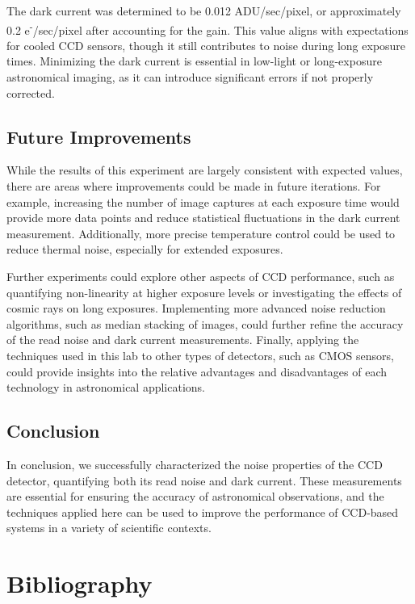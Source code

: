 \documentclass[10pt, preprint]{aastex}
\begin{document}
The dark current was determined to be 0.012 ADU/sec/pixel, or approximately 0.2 e\textsuperscript{-}/sec/pixel after accounting for the gain. This value aligns with expectations for cooled CCD sensors, though it still contributes to noise during long exposure times. Minimizing the dark current is essential in low-light or long-exposure astronomical imaging, as it can introduce significant errors if not properly corrected.

\subsection{Future Improvements}

While the results of this experiment are largely consistent with expected values, there are areas where improvements could be made in future iterations. For example, increasing the number of image captures at each exposure time would provide more data points and reduce statistical fluctuations in the dark current measurement. Additionally, more precise temperature control could be used to reduce thermal noise, especially for extended exposures.

Further experiments could explore other aspects of CCD performance, such as quantifying non-linearity at higher exposure levels or investigating the effects of cosmic rays on long exposures. Implementing more advanced noise reduction algorithms, such as median stacking of images, could further refine the accuracy of the read noise and dark current measurements. Finally, applying the techniques used in this lab to other types of detectors, such as CMOS sensors, could provide insights into the relative advantages and disadvantages of each technology in astronomical applications.

\subsection{Conclusion}

In conclusion, we successfully characterized the noise properties of the CCD detector, quantifying both its read noise and dark current. These measurements are essential for ensuring the accuracy of astronomical observations, and the techniques applied here can be used to improve the performance of CCD-based systems in a variety of scientific contexts.



\section{Bibliography}
\end{document}
